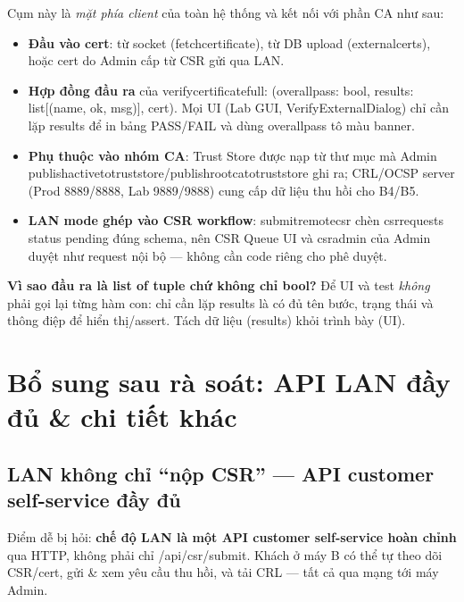 \documentclass[12pt,a4paper]{article}
\newcommand{\code}[1]{{\ttfamily\small\def\_{\textunderscore\discretionary{}{}{}}#1}}
\begin{document}
Cụm này là \emph{mặt phía client} của toàn hệ thống và kết nối với phần CA như sau:

\begin{itemize}
  \item \textbf{Đầu vào cert}: từ socket (\code{fetch\_certificate}), từ DB upload
        (\code{external\_certs}), hoặc cert do Admin cấp từ CSR gửi qua LAN.
  \item \textbf{Hợp đồng đầu ra} của \code{verify\_certificate\_full}:
        \code{(overall\_pass: bool, results: list[(name, ok, msg)], cert)}. Mọi UI
        (Lab GUI, \code{VerifyExternalDialog}) chỉ cần lặp \code{results} để in
        bảng PASS/FAIL và dùng \code{overall\_pass} tô màu banner.
  \item \textbf{Phụ thuộc vào nhóm CA}: Trust Store được nạp từ thư mục mà Admin
        \code{publish\_active\_to\_trust\_store}/\code{publish\_root\_ca\_to\_trust\_store}
        ghi ra; CRL/OCSP server (Prod 8889/8888, Lab 9889/9888) cung cấp dữ liệu
        thu hồi cho B4/B5.
  \item \textbf{LAN mode ghép vào CSR workflow}: \code{submit\_remote\_csr} chèn
        \code{csr\_requests} status \code{pending} đúng schema, nên CSR Queue UI và
        \code{csr\_admin} của Admin duyệt như request nội bộ --- không cần code
        riêng cho phê duyệt.
\end{itemize}

\begin{notebox}
\textbf{Vì sao đầu ra là \code{list of tuple} chứ không chỉ \code{bool}?} Để UI và
test \emph{không} phải gọi lại từng hàm con: chỉ cần lặp \code{results} là có đủ
tên bước, trạng thái và thông điệp để hiển thị/assert. Tách dữ liệu (results) khỏi
trình bày (UI).
\end{notebox}

\section{Bổ sung sau rà soát: API LAN đầy đủ \& chi tiết khác}

\subsection{LAN không chỉ ``nộp CSR'' --- API customer self-service đầy đủ}

\begin{warnbox}
Điểm dễ bị hỏi: \textbf{chế độ LAN là một API customer self-service hoàn chỉnh}
qua HTTP, không phải chỉ \code{/api/csr/submit}. Khách ở máy B có thể tự theo dõi
CSR/cert, gửi \& xem yêu cầu thu hồi, và tải CRL --- tất cả qua mạng tới máy Admin.
\end{warnbox}
\end{document}
